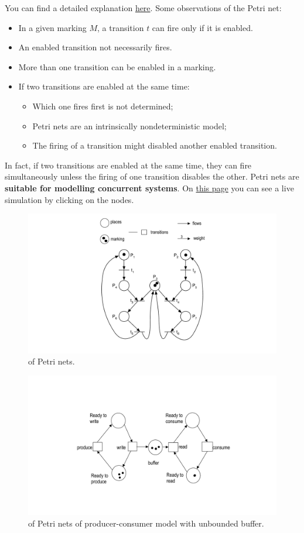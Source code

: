 \highspace
You can find a detailed explanation \href{https://isr.umd.edu/Labs/CIM/miscs/wmsor97.pdf}{here}. Some observations of the Petri net:
\begin{itemize}
    \item In a given marking $M$, a transition $t$ can fire only if it is enabled.

    \item An enabled transition not necessarily fires.

    \item More than one transition can be enabled in a marking.

    \item If two transitions are enabled at the same time:
    \begin{itemize}
        \item Which one fires first is not determined;
        \item Petri nets are an intrinsically nondeterministic model;
        \item The firing of a transition might disabled another enabled transition.
    \end{itemize}
\end{itemize}
In fact, if two transitions are enabled at the same time, they can fire simultaneously unless the firing of one transition disables the other. Petri nets are \textbf{suitable for modelling concurrent systems}. On \href{http://petrinet.org/}{this page} you can see a live simulation by clicking on the nodes.

\newpage

\begin{figure}[!htp]
    \centering
    \includegraphics[width=.6\textwidth]{img/petri-nets-1.pdf}
    \caption{ of Petri nets.}
\end{figure}

\begin{figure}[!htp]
    \centering
    \includegraphics[width=.9\textwidth]{img/petri-nets-2.pdf}
    \caption{ of Petri nets of producer-consumer model with unbounded buffer.}
\end{figure}
